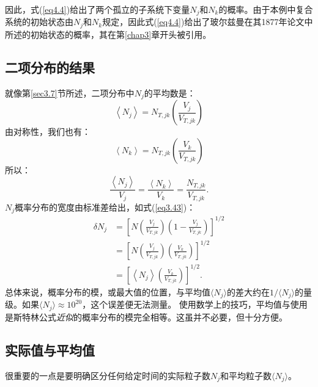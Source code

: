 \documentclass[UTF8]{ctexart}
\numberwithin{equation}{section}%
\numberwithin{figure}{section}%
\begin{document}
    因此，式(\ref{eq4.4})给出了两个孤立的子系统下变量$N_j$和$N_k$的概率。由于本例中复合系统的初始状态由$N_j$和$N_k$规定，因此式(\ref{eq4.4})给出了玻尔兹曼在其1877年论文中所述的初始状态的概率，其在第\ref{chap3}章开头被引用。

    \subsection{二项分布的结果}
    就像第\ref{sec3.7}节所述，二项分布中$N_j$的平均数是：
    \begin{equation}\label{eq4.6}
        \left\langle N_{j}\right\rangle=N_{T, j k}\left(\frac{V_{j}}{V_{T, j k}}\right)
    \end{equation}
    由对称性，我们也有：
    \begin{equation}
        \left\langle N_{k}\right\rangle=N_{T, j k}\left(\frac{V_{k}}{V_{T, j k}}\right)
    \end{equation}
    所以：
    \begin{equation}\label{eq4.8}
        \frac{\left\langle N_{j}\right\rangle}{V_{j}}=\frac{\left\langle N_{k}\right\rangle}{V_{k}}=\frac{N_{T, j k}}{V_{T, j k}} .
    \end{equation}
    $N_j$概率分布的宽度由标准差给出，如式(\ref{eq3.43})：
    \begin{equation}\label{eq4.9}
        \begin{aligned}
            \delta N_{j} &=\left[N\left(\frac{V_{j}}{V_{T, j k}}\right)\left(1-\frac{V_{j}}{V_{T, j k}}\right)\right]^{1 / 2} \\
            &=\left[N\left(\frac{V_{j}}{V_{T, j k}}\right)\left(\frac{V_{k}}{V_{T, j k}}\right)\right]^{1 / 2} \\
            &=\left[\left\langle N_{j}\right\rangle\left(\frac{V_{k}}{V_{T, j k}}\right)\right]^{1 / 2} .
        \end{aligned}
    \end{equation}
    总体来说，概率分布的模，或最大值的位置，与平均值$\langle{N_j}\rangle$的差大约在$1/\langle{N_j}\rangle$的量级。如果$\langle{N_j}\rangle\approx 10^{20}$，这个误差便无法测量。
    使用数学上的技巧，平均值与使用是斯特林公式\textit{近似}的概率分布的模完全相等。这虽并不必要，但十分方便。
    \subsection{实际值与平均值}\label{sec4.5}
    很重要的一点是要明确区分任何给定时间的实际粒子数$N_j$和平均粒子数$\langle{N_j}\rangle$。
\end{document}
